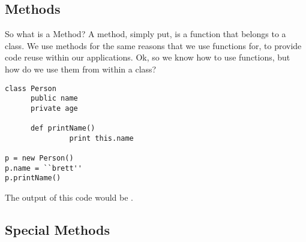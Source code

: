 \subsection{Methods}
So what is a Method?
A method, simply put, is a function that belongs to a class.
We use methods for the same reasons that we use functions for, to provide code reuse within our applications.
Ok, so we know how to use functions, but how do we use them from within a class?
\par

\begin{lstlisting}[caption={Class Methods}]
class Person
      public name
      private age
      
      def printName()
               print this.name

p = new Person()
p.name = ``brett''
p.printName()      
\end{lstlisting}

The output of this code would be .

\subsection{Special Methods}

